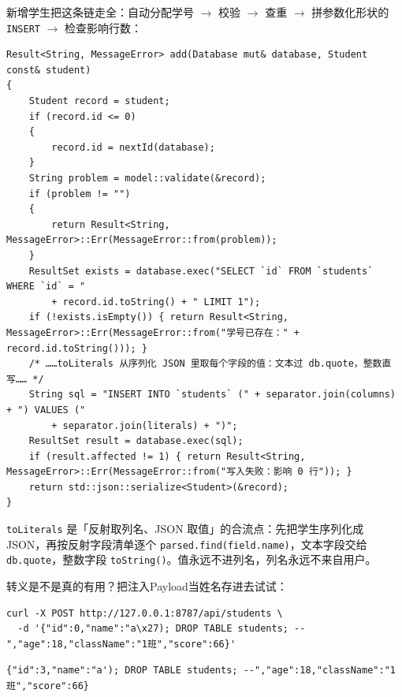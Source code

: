 新增学生把这条链走全：自动分配学号 \ensuremath{\rightarrow} 校验 \ensuremath{\rightarrow} 查重 \ensuremath{\rightarrow} 拼参数化形状的\texttt{INSERT} \ensuremath{\rightarrow} 检查影响行数：

\par
\medskip
\begin{lstlisting}[style=chali]
Result<String, MessageError> add(Database mut& database, Student const& student)
{
    Student record = student;
    if (record.id <= 0)
    {
        record.id = nextId(database);
    }
    String problem = model::validate(&record);
    if (problem != "")
    {
        return Result<String, MessageError>::Err(MessageError::from(problem));
    }
    ResultSet exists = database.exec("SELECT `id` FROM `students` WHERE `id` = "
        + record.id.toString() + " LIMIT 1");
    if (!exists.isEmpty()) { return Result<String, MessageError>::Err(MessageError::from("学号已存在：" + record.id.toString())); }
    /* ……toLiterals 从序列化 JSON 里取每个字段的值：文本过 db.quote，整数直写…… */
    String sql = "INSERT INTO `students` (" + separator.join(columns) + ") VALUES ("
        + separator.join(literals) + ")";
    ResultSet result = database.exec(sql);
    if (result.affected != 1) { return Result<String, MessageError>::Err(MessageError::from("写入失败：影响 0 行")); }
    return std::json::serialize<Student>(&record);
}
\end{lstlisting}
\par
\medskip

\texttt{to\allowbreak{}Literals} 是「反射取列名、JSON 取值」的合流点：先把学生序列化成 JSON，再按反射字段清单逐个 \texttt{parsed.\allowbreak{}find(\allowbreak{}field.\allowbreak{}name)\allowbreak{}}，文本字段交给 \texttt{db.\allowbreak{}quote}，整数字段 \texttt{to\allowbreak{}String(\allowbreak{})\allowbreak{}}。值永远不进列名，列名永远不来自用户。

转义是不是真的有用？把注入Payload当姓名存进去试试：

\par
\medskip
\begin{lstlisting}[style=sh]
curl -X POST http://127.0.0.1:8787/api/students \
  -d '{"id":0,"name":"a\x27); DROP TABLE students; --","age":18,"className":"1班","score":66}'
\end{lstlisting}
\par
\medskip

\par
\medskip
\begin{lstlisting}[style=out]
{"id":3,"name":"a'); DROP TABLE students; --","age":18,"className":"1班","score":66}
\end{lstlisting}
\par
\medskip

